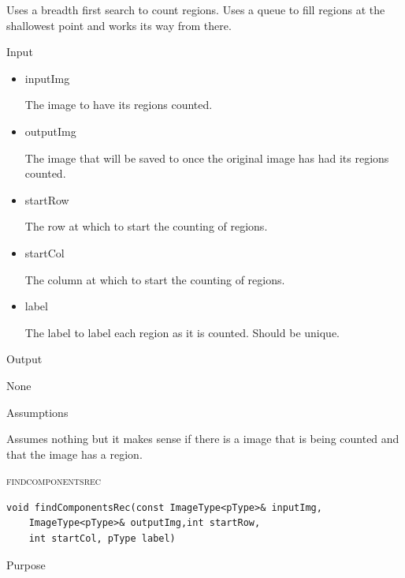 \documentclass[pdftex, 11pt]{article}
\begin{document}
\begin{description}
\begin{description}
				Uses a breadth first search to count regions. Uses
				a queue to fill regions at the shallowest point
				and works its way from there.

			\item{Input}

				\begin{itemize}

					\item{inputImg}

						The image to have its regions
						counted.

					\item{outputImg}

						The image that will be saved to
						once the original image has had
						its regions counted.

					\item{startRow}

						The row at which to start the
						counting of regions.

					\item{startCol}

						The column at which to start the
						counting of regions.

					\item{label}

						The label to label each region
						as it is counted. Should be
						unique.
				

				\end{itemize}

			\item{Output}

				None

			\item{Assumptions}

				Assumes nothing but it makes sense if there is a
				image that is being counted and that the image
				has a region.


		\end{description}
		
	\item{\textsc{findcomponentsrec}}

		\begin{lstlisting}
void findComponentsRec(const ImageType<pType>& inputImg,
	ImageType<pType>& outputImg,int startRow, 
	int startCol, pType label)
		\end{lstlisting}

		\begin{description}
			\item{Purpose}


\end{description}
\end{description}
\end{document}
